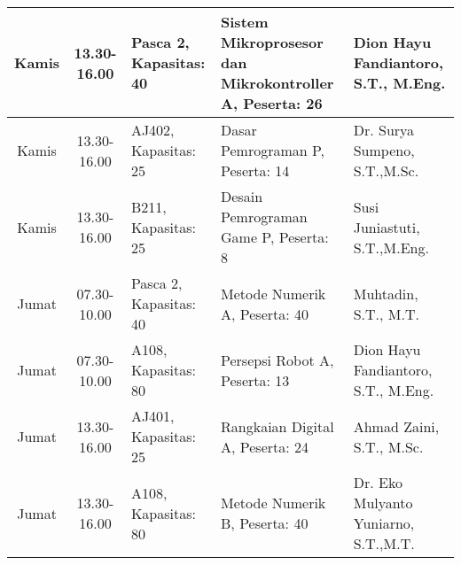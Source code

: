 \begin{longtable}[c]{|c|c|>{\centering\arraybackslash}m{2.5cm}|>{\centering\arraybackslash}m{4cm}|>{\centering\arraybackslash}m{3.2cm}|}
  Kamis  & 13.30-16.00 & Pasca 2, Kapasitas: 40 & Sistem Mikroprosesor dan Mikrokontroller A, \linebreak Peserta: 26  & Dion Hayu Fandiantoro, S.T., M.Eng.           \\ \hline
  Kamis  & 13.30-16.00 & AJ402, Kapasitas: 25   & Dasar Pemrograman P, \linebreak Peserta: 14                         & Dr. Surya Sumpeno, S.T.,M.Sc.                 \\ \hline
  Kamis  & 13.30-16.00 & B211, Kapasitas: 25    & Desain Pemrograman Game P, \linebreak Peserta: 8                    & Susi Juniastuti, S.T.,M.Eng.                  \\ \hline
  Jumat  & 07.30-10.00 & Pasca 2, Kapasitas: 40 & Metode Numerik A, \linebreak Peserta: 40                            & Muhtadin, S.T., M.T.                          \\ \hline
  Jumat  & 07.30-10.00 & A108, Kapasitas: 80    & Persepsi Robot A, \linebreak Peserta: 13                            & Dion Hayu Fandiantoro, S.T., M.Eng.           \\ \hline
  Jumat  & 13.30-16.00 & AJ401, Kapasitas: 25   & Rangkaian Digital A, \linebreak Peserta: 24                         & Ahmad Zaini, S.T., M.Sc.                      \\ \hline
  Jumat  & 13.30-16.00 & A108, Kapasitas: 80    & Metode Numerik B, \linebreak Peserta: 40                            & Dr. Eko Mulyanto Yuniarno, S.T.,M.T.          \\ \hline
\end{longtable}

 
